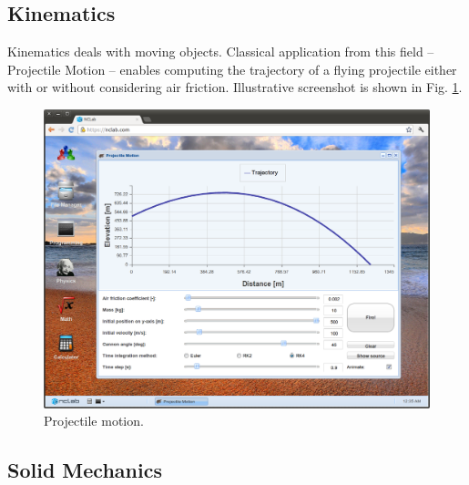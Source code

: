 \documentclass[article,A4,12pt]{llncs}
\begin{document}
\subsection{Kinematics}

Kinematics deals with moving objects.  
Classical application from this field -- Projectile Motion -- enables computing 
the trajectory of a flying projectile either with or without considering 
air friction. Illustrative screenshot is shown in Fig. 
\ref{fig:kinem1}. 
\newpage
\begin{figure}[!ht]
\begin{center}
\includegraphics[width=\textwidth]{img/kinem1.png}
\end{center}
\caption{Projectile motion.}
\label{fig:kinem1}
\end{figure}
\noindent

\subsection{Solid Mechanics}
\end{document}
